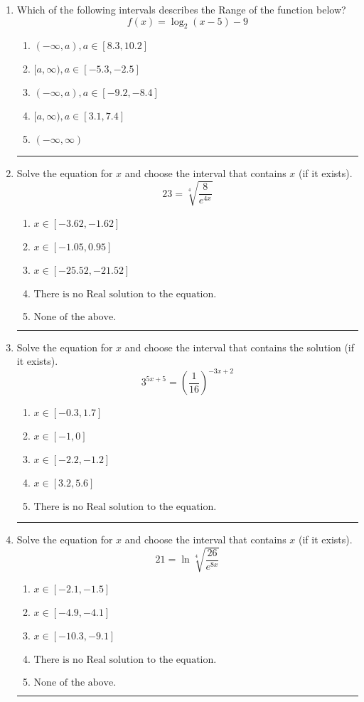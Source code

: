 \documentclass[14pt]{extbook}
\newcommand{\litem}[1]{\item#1\hspace*{-1cm}\rule{\textwidth}{0.4pt}}
\begin{document}
\begin{enumerate}
{\begin{enumerate}[label=\Alph*.]
\end{enumerate} }
\litem{
Which of the following intervals describes the Range of the function below?\[ f(x) = \log_2{(x-5)}-9 \]\begin{enumerate}[label=\Alph*.]
\item \( (-\infty, a), a \in [8.3, 10.2] \)
\item \( [a, \infty), a \in [-5.3, -2.5] \)
\item \( (-\infty, a), a \in [-9.2, -8.4] \)
\item \( [a, \infty), a \in [3.1, 7.4] \)
\item \( (-\infty, \infty) \)

\end{enumerate} }
\litem{
 Solve the equation for $x$ and choose the interval that contains $x$ (if it exists).\[  23 = \sqrt[4]{\frac{8}{e^{4x}}} \]\begin{enumerate}[label=\Alph*.]
\item \( x \in [-3.62, -1.62] \)
\item \( x \in [-1.05, 0.95] \)
\item \( x \in [-25.52, -21.52] \)
\item \( \text{There is no Real solution to the equation.} \)
\item \( \text{None of the above.} \)

\end{enumerate} }
\litem{
Solve the equation for $x$ and choose the interval that contains the solution (if it exists).\[ 3^{5x+5} = \left(\frac{1}{16}\right)^{-3x+2} \]\begin{enumerate}[label=\Alph*.]
\item \( x \in [-0.3, 1.7] \)
\item \( x \in [-1, 0] \)
\item \( x \in [-2.2, -1.2] \)
\item \( x \in [3.2, 5.6] \)
\item \( \text{There is no Real solution to the equation.} \)

\end{enumerate} }
\litem{
 Solve the equation for $x$ and choose the interval that contains $x$ (if it exists).\[  21 = \ln{\sqrt[4]{\frac{26}{e^{8x}}}} \]\begin{enumerate}[label=\Alph*.]
\item \( x \in [-2.1, -1.5] \)
\item \( x \in [-4.9, -4.1] \)
\item \( x \in [-10.3, -9.1] \)
\item \( \text{There is no Real solution to the equation.} \)
\item \( \text{None of the above.} \)


\end{enumerate}}
\end{enumerate}
\end{document}
